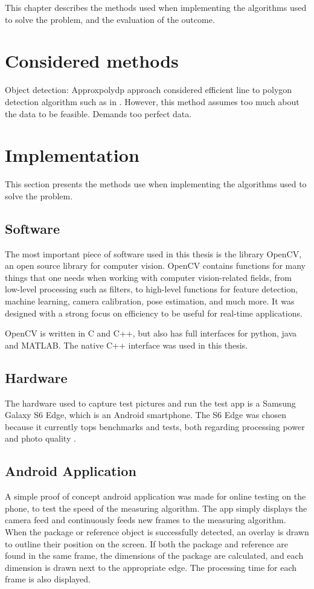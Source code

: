 This chapter describes the methods used when implementing the algorithms used to solve the problem, and the evaluation of the outcome.

\section{Considered methods}

Object detection: 
Approxpolydp approach
considered efficient line to polygon detection algorithm such as in \cite{joaquim2003polygon}.
However, this method assumes too much about the data to be feasible. Demands too perfect data.

\section{Implementation} %
This section presents the methods use when implementing the algorithms used to solve the problem. %

\subsection{Software}
The most important piece of software used in this thesis is the library OpenCV, an open source library for computer vision. %
OpenCV contains functions for many things that one needs when working with computer vision-related fields, from low-level processing such as filters, to high-level functions for feature detection, machine learning, camera calibration, pose estimation, and much more.
It was designed with a strong focus on efficiency to be useful for real-time applications. \cite{bradski2008learning}

OpenCV is written in C and C++, but also has full interfaces for python, java and MATLAB\cite{wiki:OpenCV}.
The native C++ interface was used in this thesis. %

\subsection{Hardware}
The hardware used to capture test pictures and run the test app is a Samsung Galaxy S6 Edge, which is an Android smartphone.
The S6 Edge was chosen because it currently tops benchmarks and tests, both regarding processing power and photo quality \cite{phone_performance_benchmark}\cite{phone_camera_benchmark}.

\subsection{Android Application}
A simple proof of concept android application was made for online testing on the phone, to test the speed of the measuring algorithm.
The app simply displays the camera feed and continuously feeds new frames to the measuring algorithm.
When the package or reference object is successfully detected, an overlay is drawn to outline their position on the screen.
If both the package and reference are found in the same frame, the dimensions of the package are calculated, and each dimension is drawn next to the appropriate edge.
The processing time for each frame is also displayed.

